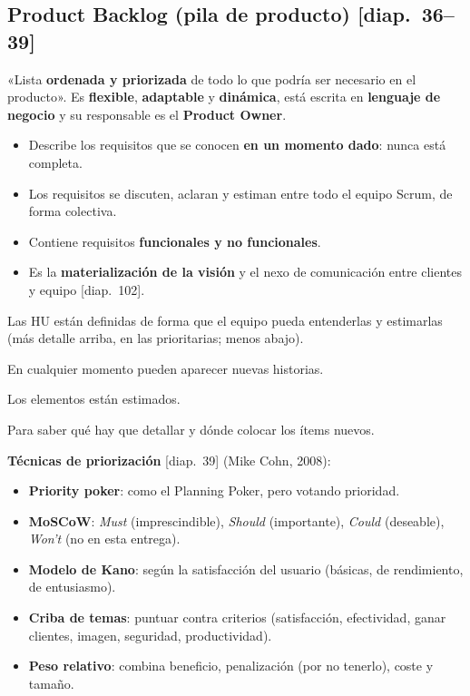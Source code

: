 \documentclass[11pt,a4paper,oneside,openany]{report}
\newcommand{\diap}[1]{\textcolor{mdaPrimary}{\small[diap.~#1]}}
\begin{document}
\subsection{Product Backlog (pila de producto) \diap{36--39}}
\begin{definicion}
«Lista \textbf{ordenada y priorizada} de todo lo que podría ser necesario en el producto». Es \textbf{flexible},
\textbf{adaptable} y \textbf{dinámica}, está escrita en \textbf{lenguaje de negocio} y su responsable es el
\textbf{Product Owner}.
\end{definicion}
\begin{itemize}[leftmargin=*]
  \item Describe los requisitos que se conocen \textbf{en un momento dado}: nunca está completa.
  \item Los requisitos se discuten, aclaran y estiman entre todo el equipo Scrum, de forma colectiva.
  \item Contiene requisitos \textbf{funcionales y no funcionales}.
  \item Es la \textbf{materialización de la visión} y el nexo de comunicación entre clientes y equipo \diap{102}.
\end{itemize}
\begin{teorema}[Lista DEEP \diap{38}]
\begin{description}[leftmargin=1.2cm,style=nextline]
  \item[\textbf{D}etallado] Las HU están definidas de forma que el equipo pueda entenderlas y estimarlas (más detalle
        arriba, en las prioritarias; menos abajo).
  \item[\textbf{E}mergente] En cualquier momento pueden aparecer nuevas historias.
  \item[\textbf{E}stimado] Los elementos están estimados.
  \item[\textbf{P}riorizado] Para saber qué hay que detallar y dónde colocar los ítems nuevos.
\end{description}
\end{teorema}
\textbf{Técnicas de priorización} \diap{39} (Mike Cohn, 2008):
\begin{itemize}[leftmargin=*,itemsep=1pt]
  \item \textbf{Priority poker}: como el Planning Poker, pero votando prioridad.
  \item \textbf{MoSCoW}: \emph{Must} (imprescindible), \emph{Should} (importante), \emph{Could} (deseable),
        \emph{Won't} (no en esta entrega).
  \item \textbf{Modelo de Kano}: según la satisfacción del usuario (básicas, de rendimiento, de entusiasmo).
  \item \textbf{Criba de temas}: puntuar contra criterios (satisfacción, efectividad, ganar clientes, imagen,
        seguridad, productividad).
  \item \textbf{Peso relativo}: combina beneficio, penalización (por no tenerlo), coste y tamaño.
\end{itemize}
\end{document}
